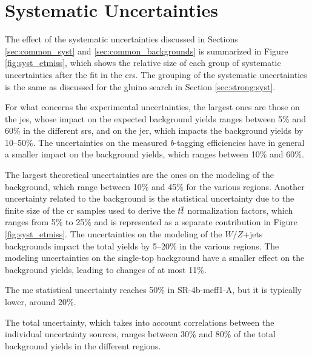 \section{Systematic Uncertainties}
\label{sec:ewk:syst}

The effect of the systematic uncertainties discussed in Sections \ref{sec:common_syst} and \ref{sec:common_backgrounds} 
is summarized in Figure \ref{fig:syst_etmiss}, which shows the relative size of each group of systematic uncertainties after the fit in the 
\glspl{cr}. 
The grouping of the systematic uncertainties is the same as discussed for the gluino search in Section \ref{sec:strong:syst}. 

For what concerns the experimental uncertainties, the largest ones are those on the \gls{jes}, 
whose impact on the expected background yields ranges between 5\% and 60\% in the different \glspl{sr}, 
and on the \gls{jer}, which impacts the background yields by 10--50\%. 
The uncertainties on the measured \textit{b}-tagging efficiencies have in general a smaller impact on the background yields, 
which ranges between 10\% and 60\%. 

The largest theoretical uncertainties are the ones on the modeling of the \ttbar background, which range between 10\% and 45\% for the various regions. 
Another uncertainty related to the \ttbar background is the statistical uncertainty due to the finite size of the \gls{cr} samples used to derive  the $t\overline{t}$ normalization factors, which ranges from 5\% to 25\% and is represented as a separate contribution in Figure \ref{fig:syst_etmiss}.  
The uncertainties on the modeling of the $W/Z$+jets backgrounds  
impact the total yields by 5--20\% in the various regions. 
The modeling uncertainties on the single-top background have a smaller effect on the background yields, leading to changes of at most 11\%. 

The \gls{mc} statistical uncertainty reaches 50\% in SR-4b-meff1-A, but it is typically lower, around 20\%. 
 
The total uncertainty, which takes into account correlations between the individual uncertainty sources, ranges between 30\% and 80\% 
of the total background yields in the different regions. 
 

